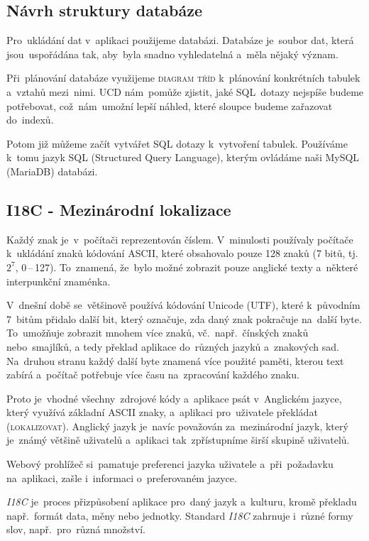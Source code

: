 \documentclass[14pt,a4paper]{article}
\begin{document}
        \subsection{Návrh struktury databáze}
        Pro~ukládání dat v~aplikaci použijeme databázi. Databáze je~soubor dat, která jsou~uspořádána tak, aby~byla snadno vyhledatelná a~měla nějaký význam.

        Při~plánování databáze využijeme \textsc{diagram tříd} k~plánování konkrétních tabulek a~vztahů mezi~nimi. \textsc{UCD} nám~pomůže zjistit, jaké SQL~dotazy nejspíše budeme potřebovat, což~nám~umožní lepší náhled, které sloupce budeme zařazovat do~indexů.

        Potom již můžeme začít vytvářet SQL dotazy k~vytvoření tabulek. Používáme k~tomu jazyk \textsc{SQL} (Structured Query Language), kterým ovládáme naši MySQL (MariaDB) databázi.

        \subsection{I18C - Mezinárodní lokalizace}
        Každý znak je~v~počítači reprezentován číslem. V~minulosti používaly počítače k~ukládání znaků kódování \textsc{ASCII}, které obsahovalo pouze 128 znaků (7 bitů, tj.~$2^7$, 0\,--\,127). To~znamená, že~bylo možné zobrazit pouze anglické texty a~některé interpunkční znaménka. 
        
        V~dnešní době se~většinově používá kódování Unicode (UTF), které k~původním 7~bitům přidalo další bit, který označuje, zda daný znak pokračuje na~další byte. To~umožňuje zobrazit mnohem více znaků, vč.~např.~čínských znaků nebo~smajlíků, a tedy překlad aplikace do~různých jazyků a~znakových sad. Na~druhou stranu každý další byte znamená více použité paměti, kterou text zabírá a~počítač potřebuje více času na~zpracování každého znaku.
        
        Proto je~vhodné všechny~zdrojové kódy a~aplikace psát v~Anglickém jazyce, který využívá základní \textsc{ASCII} znaky, a~aplikaci pro~uživatele překládat (\textsc{lokalizovat}). Anglický jazyk je~navíc považován za~mezinárodní jazyk, který je~známý většině uživatelů a~aplikaci tak~zpřístupníme širší skupině uživatelů.
        
        Webový prohlížeč si~pamatuje preferenci jazyka uživatele a~při~požadavku na~aplikaci, zašle i~informaci o~preferovaném jazyce.

        \emph{I18C} je~proces přizpůsobení aplikace pro~daný jazyk a~kulturu, kromě překladu např.~formát data, měny nebo jednotky. Standard \emph{I18C} zahrnuje i~různé formy slov, např.~pro~různá množství. \cite{w3Internationalization}
\end{document}
